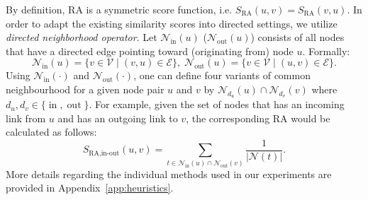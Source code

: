 \documentclass{article}
\begin{document}
By definition, RA is a symmetric score function, i.e. $S_{\operatorname{RA}}(u, v) = S_{\operatorname{RA}}(v, u)$. In order to adapt the existing similarity scores into directed settings, we utilize \emph{directed neighborhood operator}. Let $\mathcal{N}_{\operatorname{in}}(u)$ ($\mathcal{N}_{\operatorname{out}}(u)$) consists of all nodes that have a directed edge pointing toward (originating from) node $u$. Formally:
\begin{equation}\label{eq:directed_neighborhood}
    \mathcal{N}_{\operatorname{in}}(u) = \{v \in \mathcal{V} \mid (v, u) \in \mathcal{E}\}, \;
    \mathcal{N}_{\operatorname{out}}(u) = \{v \in \mathcal{V} \mid (u, v) \in \mathcal{E}\}.
\end{equation}
Using $\mathcal{N}_{\operatorname{in}}(\cdot)$ and $\mathcal{N}_{\operatorname{out}}(\cdot)$,
one can define four variants of common neighbourhood for a given node pair $u$ and $v$ by $\mathcal{N}_{d_u}(u) \cap \mathcal{N}_{d_v}(v)$ where $d_u, d_v \in \{\operatorname{in}, \operatorname{out}\}$. For example, given the set of nodes that has an incoming link from $u$ and has an outgoing link to $v$, the corresponding RA would be calculated as follows:
\begin{equation}
    S_{\operatorname{RA, in-out}}(u, v) = \sum_{t \in \mathcal{N}_{\operatorname{in}}(u) \cap \mathcal{N}_{\operatorname{out}}(v)}\frac{1}{|\mathcal{N}(t)|}.
\end{equation}
More details regarding the individual methods used in our experiments are provided in Appendix~\ref{app:heuristics}.
\end{document}
